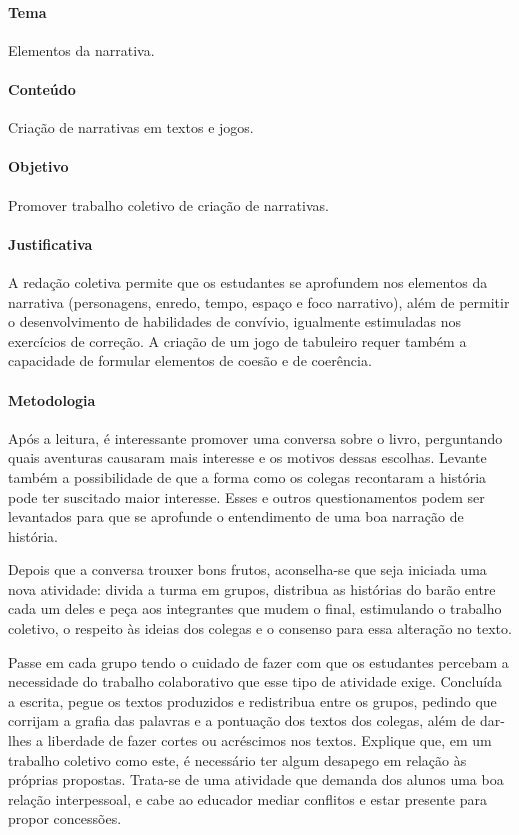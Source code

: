 \documentclass[11pt]{extarticle}
\begin{document}
\paragraph{Tema} Elementos da narrativa.

\paragraph{Conteúdo} Criação de narrativas em textos e jogos.  

\paragraph{Objetivo} Promover trabalho coletivo de criação de narrativas.  

\paragraph{Justificativa} A redação coletiva permite que os estudantes se aprofundem nos elementos da narrativa (personagens, enredo, tempo, espaço e foco narrativo), além de permitir o desenvolvimento de habilidades de convívio, igualmente estimuladas nos exercícios de correção. A criação de um jogo de tabuleiro requer também a capacidade de formular elementos de coesão e de coerência. 

\paragraph{Metodologia} Após a leitura, é interessante promover uma conversa sobre o livro, perguntando quais aventuras causaram mais interesse e os motivos dessas escolhas. Levante também a possibilidade de que a forma como os colegas recontaram a história pode ter suscitado maior interesse. Esses e outros questionamentos podem ser levantados para que se aprofunde o entendimento de uma boa narração de história. 

Depois que a conversa trouxer bons frutos, aconselha-se que seja iniciada uma nova atividade: divida a turma em grupos, distribua as histórias do barão entre cada um deles e peça aos integrantes que mudem o final, estimulando o trabalho coletivo, o respeito às ideias dos colegas e o consenso para essa alteração no texto. 

Passe em cada grupo tendo o cuidado de fazer com que os estudantes percebam a necessidade do trabalho colaborativo que esse tipo de atividade exige. Concluída a escrita, pegue os textos produzidos e redistribua entre os grupos, pedindo que corrijam a grafia das palavras e a pontuação dos textos dos colegas, além de dar-lhes a liberdade de fazer cortes ou acréscimos nos textos. Explique que, em um trabalho coletivo como este, é necessário ter algum desapego em relação às próprias propostas. Trata-se de uma atividade que demanda dos alunos uma boa relação interpessoal, e cabe ao educador mediar conflitos e estar presente para propor concessões. 
\end{document}

